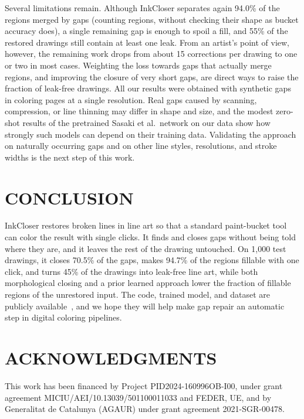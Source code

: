 \documentclass{IEEEcsmag}
\begin{document}
Several limitations remain. Although InkCloser separates again 94.0\% of the regions merged
by gaps (counting regions, without checking their shape as bucket accuracy does), a single remaining gap is enough to spoil a fill, and 55\% of the restored
drawings still contain at least one leak. From an artist's point of view, however,
the remaining work drops from about 15 corrections per drawing to one or two in most
cases. Weighting the loss towards gaps that actually merge regions, and improving the
closure of very short gaps, are direct ways to raise the fraction of leak-free
drawings. All our results were obtained with synthetic gaps in coloring pages at a
single resolution. Real gaps caused by scanning, compression, or line thinning may
differ in shape and size, and the modest zero-shot results of the pretrained Sasaki
et al.\ network on our data show how strongly such models can depend on their
training data. Validating the approach on naturally occurring gaps and on other line
styles, resolutions, and stroke widths is the next step of this work.

\section{CONCLUSION}

InkCloser restores broken lines in line art so that a standard paint-bucket tool can
color the result with single clicks. It finds and closes gaps without being told
where they are, and it leaves the rest of the drawing untouched. On 1,000 test
drawings, it closes 70.5\% of the gaps, makes 94.7\% of the regions fillable with one
click, and turns 45\% of the drawings into leak-free line art, while both
morphological closing and a prior learned approach lower the fraction of fillable
regions of the unrestored input.
The code, trained model, and dataset are publicly
available~\cite{codeInkCloser,datasetInkCloser}, and we hope they will help make gap
repair an automatic step in digital coloring pipelines.

\section{ACKNOWLEDGMENTS}

This work has been financed by Project PID2024-160996OB-I00, under grant agreement
MICIU/AEI/10.13039/501100011033 and FEDER, UE, and by Generalitat de Catalunya
(AGAUR) under grant agreement 2021-SGR-00478.

\def\refname{REFERENCES}


\end{document}
